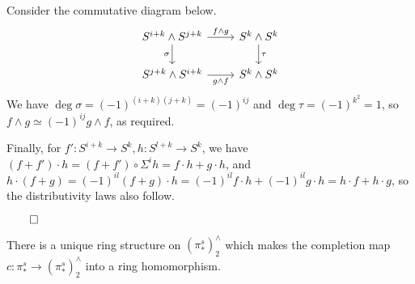 \documentclass{MetricNotes2023}
\def\done{\begin{flushright}\vspace{-4.35ex}\(\qed\)\end{flushright}}
\begin{document}
\begin{ourproof}
Consider the commutative diagram below.
\[\begin{tikzcd}
S^{i+k}\wedge S^{j+k} \arrow[r, "f \wedge g"] \arrow[d, swap, "\sigma"]  & S^k \wedge S^k \arrow[d, "\tau"]  \\
S^{j+k}\wedge S^{i+k} \arrow[r, swap, "g \wedge f"]  & S^k \wedge S^k
\end{tikzcd}\]
We have \(\deg \sigma=(-1)^{(i+k)(j+k)}=(-1)^{ij}\) and \(\deg \tau = (-1)^{k^2}=1\), so \(f\wedge g \simeq (-1)^{ij}g\wedge f\), as required.

Finally, for \(f' : S^{i+k}\to S^k, h : S^{l+k}\to S^k\), we have \((f+f')\cdot h= (f+f')\circ \Sigma^i h = f\cdot h + g \cdot h\), and \(h\cdot (f+g)=(-1)^{il}(f+g)\cdot h=(-1)^{il}f\cdot h + (-1)^{il}g \cdot h = h\cdot f +h \cdot g\), so the distributivity laws also follow. \done
\end{ourproof}

\begin{lemma}\label{2504071013}
There is a unique ring structure on \((\pi_*^s)^\wedge_2\) which makes the completion map \(c : \pi_*^s \to (\pi_*^s)^\wedge_2\) into a ring homomorphism. 
\end{lemma}
\end{document}
